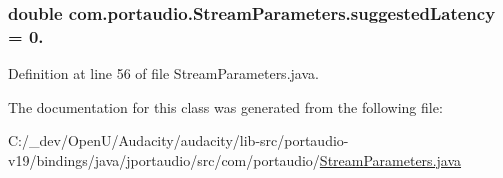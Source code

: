 \subsubsection[{\texorpdfstring{suggested\+Latency}{suggestedLatency}}]{\setlength{\rightskip}{0pt plus 5cm}double com.\+portaudio.\+Stream\+Parameters.\+suggested\+Latency = 0.}\hypertarget{classcom_1_1portaudio_1_1_stream_parameters_a801e70d84a805c96736b3149c8b783c8}{}\label{classcom_1_1portaudio_1_1_stream_parameters_a801e70d84a805c96736b3149c8b783c8}


Definition at line 56 of file Stream\+Parameters.\+java.



The documentation for this class was generated from the following file\+:\begin{DoxyCompactItemize}
\item 
C\+:/\+\_\+dev/\+Open\+U/\+Audacity/audacity/lib-\/src/portaudio-\/v19/bindings/java/jportaudio/src/com/portaudio/\hyperlink{_stream_parameters_8java}{Stream\+Parameters.\+java}\end{DoxyCompactItemize}
